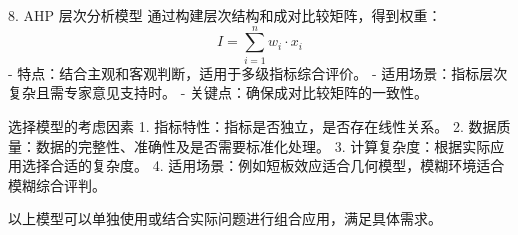 \documentclass[UTF8, fontset=windows]{mcmthesis}
\begin{document}
\begin{ReportAiUse}{9}
8. AHP 层次分析模型
通过构建层次结构和成对比较矩阵，得到权重：
\[
I = \sum_{i=1}^n w_i \cdot x_i
\]
- 特点：结合主观和客观判断，适用于多级指标综合评价。
- 适用场景：指标层次复杂且需专家意见支持时。
- 关键点：确保成对比较矩阵的一致性。

选择模型的考虑因素
1. 指标特性：指标是否独立，是否存在线性关系。
2. 数据质量：数据的完整性、准确性及是否需要标准化处理。
3. 计算复杂度：根据实际应用选择合适的复杂度。
4. 适用场景：例如短板效应适合几何模型，模糊环境适合模糊综合评判。

以上模型可以单独使用或结合实际问题进行组合应用，满足具体需求。

\end{ReportAiUse}
\end{document}
